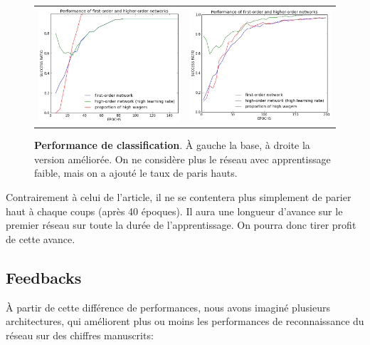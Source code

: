 \documentclass[a4paper,12pt, twoside]{article}
\begin{document}
\begin{figure}[H]
\begin{center}
\begin{tabular}{cc}
 \includegraphics[width=230px]{../cleeremans_2007/digital_reco/perf_wag.png} &
 \includegraphics[width=230px]{../cleeremans_2007/digital_reco/perf_boost.png}
\end{tabular}
\end{center}
 \caption{ \textbf{Performance de classification}. À gauche la base, à droite la version améliorée.
 On ne considère plus le réseau avec apprentissage faible, mais on a ajouté le taux de paris hauts.}
\end{figure}

Contrairement à celui de l'article, il ne se contentera 
plus simplement de parier haut à chaque coups (après 40 époques). Il aura une longueur d'avance
sur le premier réseau sur toute la durée de l'apprentissage. On pourra donc tirer profit de
cette avance.

\subsection{Feedbacks}

À partir de cette différence de performances, nous avons imaginé plusieurs architectures, qui
améliorent plus ou moins les performances de reconnaissance du réseau sur des chiffres manuscrits:
\end{document}
